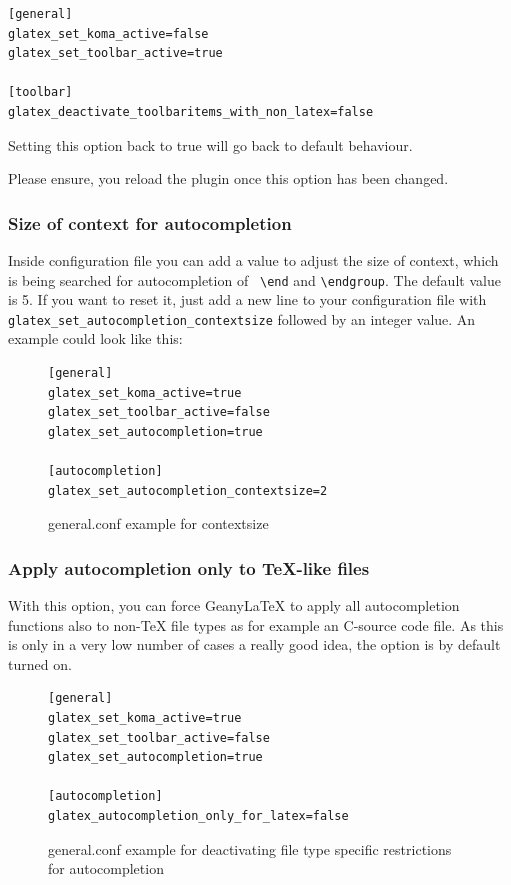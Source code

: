 \documentclass[%
a4paper,%
10pt,%
oneside,%
DIV18,
headsepline,
plainheadsepline,
footsepline,
plainfootsepline,
bibtotoc,%
liststotoc,%
BCOR12mm,%
halfparskip,%
openany,%
]{scrartcl}
\begin{document}
\begin{lstlisting}
[general]
glatex_set_koma_active=false
glatex_set_toolbar_active=true

[toolbar]
glatex_deactivate_toolbaritems_with_non_latex=false
\end{lstlisting}

Setting this option back to true will go back to default behaviour.

Please ensure, you reload the plugin once this option has been changed.

\subsubsection{Size of context for autocompletion}
\label{sec:hidden_pref_autocompletion_context}
Inside configuration file you can add a value to adjust the size of
context, which is being searched for autocompletion of \texttt{
\textbackslash{}end} and \texttt{\textbackslash{}endgroup}. The
default value is 5. If you want to reset it, just add a new line to
your configuration file with
\texttt{glatex\_set\_autocompletion\_contextsize} followed by an integer
value. An example could look like this:

\begin{figure}[h!]
\begin{lstlisting}
[general]
glatex_set_koma_active=true
glatex_set_toolbar_active=false
glatex_set_autocompletion=true

[autocompletion]
glatex_set_autocompletion_contextsize=2
\end{lstlisting}
\caption{general.conf example for contextsize}
\end{figure}

\subsubsection{Apply autocompletion only to \TeX{}-like files}
With this option, you can force Geany\LaTeX{} to apply all autocompletion functions also to non-\TeX{} file types as for example an C-source code file. As this is only in a very low number of cases a really good idea, the option is by default turned on.

\begin{figure}[h!]
\begin{lstlisting}
[general]
glatex_set_koma_active=true
glatex_set_toolbar_active=false
glatex_set_autocompletion=true

[autocompletion]
glatex_autocompletion_only_for_latex=false
\end{lstlisting}
\caption{general.conf example for deactivating file type specific restrictions for autocompletion}
\end{figure}
\end{document}
